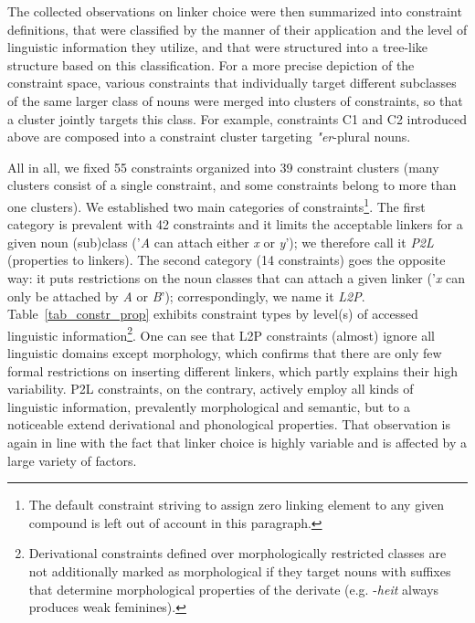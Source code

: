 \documentclass[10pt, a4paper]{article}
\begin{document}
The collected observations on linker choice were then summarized into constraint definitions, that were classified by the manner of their application and the level of linguistic information they utilize, and that were structured into a tree-like structure based on this classification. For a more precise depiction of the constraint space, various constraints that individually target different subclasses of the same larger class of nouns were merged into clusters of constraints, so that a cluster jointly targets this class. For example, constraints C1 and C2 introduced above are composed into a constraint cluster targeting \textit{"er}-plural nouns.

All in all, we fixed 55 constraints organized into 39 constraint clusters (many clusters consist of a single constraint, and some constraints belong to more than one clusters). We established two main categories of constraints\footnote{The default constraint striving to assign zero linking element to any given compound is left out of account in this paragraph.}. The first category is prevalent with 42 constraints and it limits the acceptable linkers for a given noun (sub)class ('\textit{A} can attach either \textit{x} or \textit{y}'); we therefore call it \textit{P2L} (properties to linkers). The second category (14 constraints) goes the opposite way: it puts restrictions on the noun classes that can attach a given linker ('\textit{x} can only be attached by \textit{A} or \textit{B}'); correspondingly, we name it \textit{L2P}. Table~\ref{tab_constr_prop} exhibits constraint types by level(s) of accessed linguistic information\footnote{Derivational constraints defined over morphologically restricted classes are not additionally marked as morphological if they target nouns with suffixes that determine morphological properties of the derivate (e.g. -\textit{heit} always produces weak feminines).}. One can see that L2P constraints (almost) ignore all linguistic domains except morphology, which confirms that there are only few formal restrictions on inserting different linkers, which partly explains their high variability. P2L constraints, on the contrary, actively employ all kinds of linguistic information, prevalently morphological and semantic, but to a noticeable extend derivational and phonological properties. That observation is again in line with the fact that linker choice is highly variable and is affected by a large variety of factors.
\end{document}
